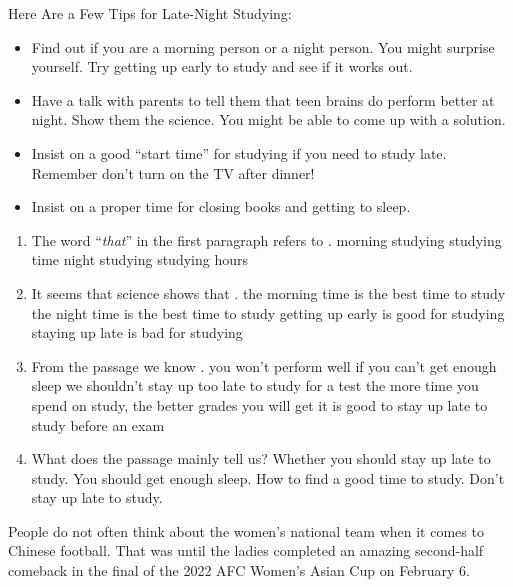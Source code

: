 \documentclass{ExamJHSEngl}
\begin{document}
Here Are a Few Tips for Late-Night Studying:

\begin{itemize}
  \item Find out if you are a morning person or a night person. You might surprise yourself. Try getting up early to study and see if it works out.
  \item Have a talk with parents to tell them that teen brains do perform better at night. Show them the science. You might be able to come up with a solution.
  \item Insist on a good “start time” for studying if you need to study late. Remember don't turn on the TV after dinner!
  \item Insist on a proper time for closing books and getting to sleep.
\end{itemize}

\begin{enumerate}[resume,ref={\arabic*},labelsep=-0.1em]

\item[\choice{C}] The word “\emph{that}” in the first paragraph refers to \blank.
\options
  {morning studying}
  {studying time}
  {night studying}
  {studying hours}

\item[\choice{B}] It seems that science shows that \blank.
\options
  {the morning time is the best time to study}
  {the night time is the best time to study}
  {getting up early is good for studying}
  {staying up late is bad for studying}

\item[\choice{A}] From the passage we know \blank.
\options
  {you won’t perform well if you can’t get enough sleep}
  {we shouldn’t stay up too late to study for a test}
  {the more time you spend on study, the better grades you will get}
  {it is good to stay up late to study before an exam}

\item[\choice{A}] What does the passage mainly tell us?
\options
  {Whether you should stay up late to study.}
  {You should get enough sleep.}
  {How to find a good time to study.}
  {Don’t stay up late to study.}
 
\end{enumerate}



People do not often think about the women's national team when it comes to Chinese football. That was until the ladies completed an amazing second-half comeback in the final of the 2022 AFC Women's Asian Cup on February 6.
\end{document}
